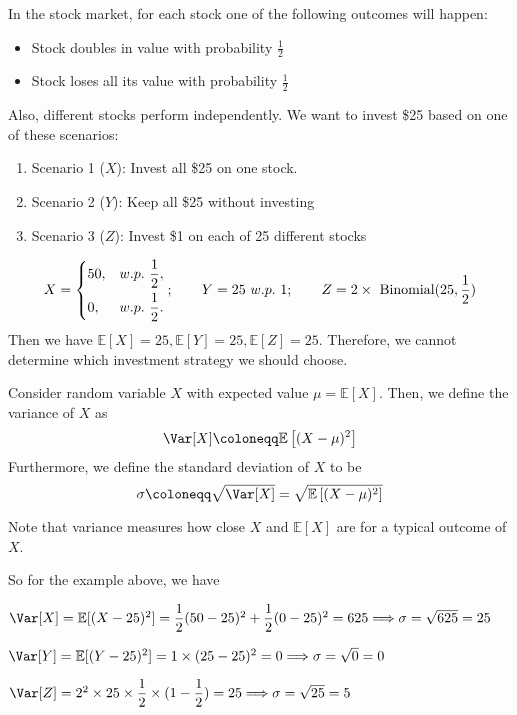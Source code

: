 In the stock market, for each stock one of the following outcomes will happen:
\begin{itemize}
    \item Stock doubles in value with probability \(\frac{1}{2}\) 
    \item Stock loses all its value with probability \(\frac{1}{2}\) 
\end{itemize}
Also, different stocks perform independently. We want to invest \$25 based on one of these scenarios:
\begin{enumerate}
    \item Scenario 1 (\(X\)): Invest all \$25 on one stock. 
    \item Scenario 2 (\(Y\)): Keep all \$25 without investing
    \item Scenario 3 (\(Z\)): Invest \$1 on each of 25 different stocks
\end{enumerate}
\[
    X = \begin{dcases}
        50, & w.p.\ \frac{1}{2}  ,\\
        0, & w.p.\ \frac{1}{2}  .
    \end{dcases};
    \quad\quad 
    Y = 25\ w.p.\ 1;
    \quad\quad 
    Z = 2 \times \ \text{Binomial}(25, \frac{1}{2})
\]
Then we have \(\mathbb{E}[X] = 25, \mathbb{E}[Y] = 25, \mathbb{E}[Z] = 25 \). Therefore, we cannot determine which investment strategy we should choose. 

\begin{definition}
    Consider random variable \(X\) with expected value \(\mu = \mathbb{E}[X]\). Then, we define the variance of \(X\) as
    \[
        \Var[X] \coloneqq \mathbb{E}\left[(X - \mu)^2 \right] 
    \]
    Furthermore, we define the standard deviation of \(X\) to be
    \[
        \sigma \coloneqq \sqrt{\Var[X]} =  \sqrt{\mathbb{E}\left[(X - \mu)^2 \right]} 
    \]
\end{definition}

Note that variance measures how close \(X\) and \(\mathbb{E}[X]\) are for a typical outcome of \(X\).

So for the example above, we have 

\(\Var[X] = \mathbb{E}[(X - 25)^2] = \dfrac{1}{2}(50 - 25)^2 + \dfrac{1}{2} (0 - 25)^2 = 625 \Longrightarrow \sigma = \sqrt{625} = 25\) 

\(\Var[Y] = \mathbb{E}[(Y - 25)^2] = 1 \times (25 - 25)^2 = 0 \Longrightarrow \sigma = \sqrt{0} = 0\) 

\(\Var[Z] = 2^2 \times 25 \times \dfrac{1}{2} \times (1 - \dfrac{1}{2}) = 25 \Longrightarrow \sigma = \sqrt{25} = 5\) 

